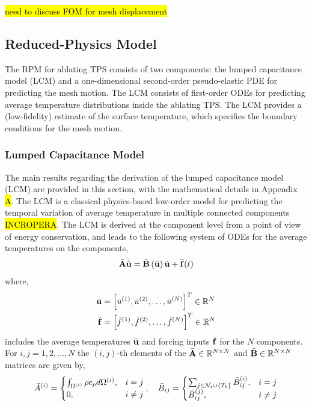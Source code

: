 \hl{need to discuss FOM for mesh displacement}

\subsection{Reduced-Physics Model}

The RPM for ablating TPS consists of two components: the lumped capacitance model (LCM) and a one-dimensional second-order pseudo-elastic PDE for predicting the mesh motion. The LCM consists of first-order ODEs for predicting average temperature distributions inside the ablating TPS. The LCM provides a (low-fidelity) estimate of the surface temperature, which specifies the boundary conditions for the mesh motion.

\subsubsection{Lumped Capacitance Model}

The main results regarding the derivation of the lumped capacitance model (LCM) are provided in this section, with the mathematical details in Appendix \hl{A}. The LCM is a classical physics-based low-order model for predicting the temporal variation of average temperature in multiple connected components \hl{INCROPERA}. The LCM is derived at the component level from a point of view of energy conservation, and leads to the following system of ODEs for the average temperatures on the components,
\begin{equation}
    \bar{\mathbf{A}}\dot{\bar{\mathbf{u}}} = \bar{\mathbf{B}}\left(\bar{\mathbf{u}}\right)\bar{\mathbf{u}} + \bar{\mathbf{f}}(t)\label{eqn_lcm}
\end{equation}
where,
\begin{subequations}
    \begin{align}
       \bar{\mathbf{u}} &= \left[\bar{u}^{(1)},\bar{u}^{(2)},\dots,\bar{u}^{(N)}\right]^T\in\mathbb{R}^{N}\\
        \bar{\mathbf{f}} &= \left[\bar{f}^{(1)},\bar{f}^{(2)},\dots,\bar{f}^{(N)}\right]^T\in\mathbb{R}^{N}
    \end{align}
\end{subequations}
includes the average temperatures $\bar{\mathbf{u}}$ and forcing inputs $\bar{\mathbf{f}}$ for the $N$ components. For $i,j=1,2,\dots,N$ the $(i,j)$-th elements of the $\bar{\mathbf{A}}\in\mathbb{R}^{N\times N}$ and $\bar{\mathbf{B}}\in\mathbb{R}^{N\times N}$ matrices are given by,
\begin{equation}
    \bar{A}^{(i)} = \begin{cases}
            \int_{\Omega^{(i)}}\rho c_p d\Omega^{(i)}, & i=j\\
            0, & i\neq j
        \end{cases},\quad \bar{B}_{ij} = \begin{cases}
        \sum_{j\in\mathcal{N}_i\cup\left\{T_b\right\}}\bar{B}^{(i)}_{ij}, &i=j \\
        \bar{B}^{(j)}_{ij}, & i\neq j
    \end{cases}
\end{equation}

